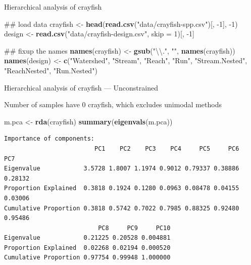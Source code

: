 \documentclass[10pt,ignorenonframetext,compress, aspectratio=169]{beamer}
\newenvironment{Shaded}{\begin{snugshade}}{\end{snugshade}}
\newcommand{\KeywordTok}[1]{\textcolor[rgb]{0.13,0.29,0.53}{\textbf{{#1}}}}
\newcommand{\DataTypeTok}[1]{\textcolor[rgb]{0.13,0.29,0.53}{{#1}}}
\newcommand{\DecValTok}[1]{\textcolor[rgb]{0.00,0.00,0.81}{{#1}}}
\newcommand{\CharTok}[1]{\textcolor[rgb]{0.31,0.60,0.02}{{#1}}}
\newcommand{\StringTok}[1]{\textcolor[rgb]{0.31,0.60,0.02}{{#1}}}
\newcommand{\NormalTok}[1]{{#1}}
\begin{document}
\begin{frame}[fragile]{Hierarchical analysis of crayfish}

\begin{Shaded}
\begin{Highlighting}[]
\NormalTok{## load data}
\NormalTok{crayfish <-}\StringTok{ }\KeywordTok{head}\NormalTok{(}\KeywordTok{read.csv}\NormalTok{(}\StringTok{"data/crayfish-spp.csv"}\NormalTok{)[, -}\DecValTok{1}\NormalTok{], -}\DecValTok{1}\NormalTok{)}
\NormalTok{design <-}\StringTok{ }\KeywordTok{read.csv}\NormalTok{(}\StringTok{"data/crayfish-design.csv"}\NormalTok{, }\DataTypeTok{skip =} \DecValTok{1}\NormalTok{)[, -}\DecValTok{1}\NormalTok{]}

\NormalTok{## fixup the names}
\KeywordTok{names}\NormalTok{(crayfish) <-}\StringTok{ }\KeywordTok{gsub}\NormalTok{(}\StringTok{"}\CharTok{\textbackslash{}\textbackslash{}}\StringTok{."}\NormalTok{, }\StringTok{""}\NormalTok{, }\KeywordTok{names}\NormalTok{(crayfish))}
\KeywordTok{names}\NormalTok{(design) <-}\StringTok{ }\KeywordTok{c}\NormalTok{(}\StringTok{"Watershed"}\NormalTok{, }\StringTok{"Stream"}\NormalTok{, }\StringTok{"Reach"}\NormalTok{, }\StringTok{"Run"}\NormalTok{,}
                   \StringTok{"Stream.Nested"}\NormalTok{, }\StringTok{"ReachNested"}\NormalTok{, }\StringTok{"Run.Nested"}\NormalTok{)}
\end{Highlighting}
\end{Shaded}

\end{frame}

\begin{frame}[fragile]{Hierarchical analysis of crayfish ---
Unconstrained}

Number of samples have 0 crayfish, which excludes unimodal methods

\scriptsize

\begin{Shaded}
\begin{Highlighting}[]
\NormalTok{m.pca <-}\StringTok{ }\KeywordTok{rda}\NormalTok{(crayfish)}
\KeywordTok{summary}\NormalTok{(}\KeywordTok{eigenvals}\NormalTok{(m.pca))}
\end{Highlighting}
\end{Shaded}

\begin{verbatim}
Importance of components:
                         PC1    PC2    PC3    PC4     PC5     PC6     PC7
Eigenvalue            3.5728 1.8007 1.1974 0.9012 0.79337 0.38886 0.28132
Proportion Explained  0.3818 0.1924 0.1280 0.0963 0.08478 0.04155 0.03006
Cumulative Proportion 0.3818 0.5742 0.7022 0.7985 0.88325 0.92480 0.95486
                          PC8     PC9     PC10
Eigenvalue            0.21225 0.20528 0.004881
Proportion Explained  0.02268 0.02194 0.000520
Cumulative Proportion 0.97754 0.99948 1.000000
\end{verbatim}

\normalsize

\end{frame}
\end{document}
